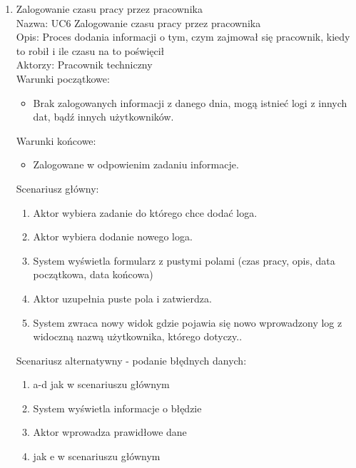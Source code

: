 \begin{enumerate}
\item Zalogowanie czasu pracy przez pracownika \\
Nazwa: UC6 Zalogowanie czasu pracy przez pracownika \\
Opis: Proces dodania informacji o tym, czym zajmował się pracownik, kiedy to robił i ile czasu na to poświęcił \\
Aktorzy: Pracownik techniczny \\
Warunki początkowe:
\begin{itemize}
\item Brak zalogowanych informacji z danego dnia, mogą istnieć logi z innych dat, bądź innych użytkowników.
\end{itemize}
Warunki końcowe:
\begin{itemize}
\item Zalogowane w odpowienim zadaniu informacje.
\end{itemize}
Scenariusz główny:
\begin{enumerate}
\item Aktor wybiera zadanie do którego chce dodać loga.
\item Aktor wybiera dodanie nowego loga.
\item System wyświetla formularz z pustymi polami (czas pracy, opis, data początkowa, data końcowa)
\item Aktor uzupełnia puste pola i zatwierdza.
\item System zwraca nowy widok gdzie pojawia się nowo wprowadzony log z widoczną nazwą użytkownika, którego dotyczy..
\end{enumerate}
Scenariusz alternatywny - podanie błędnych danych: 
\begin{enumerate}
\item a-d jak w scenariuszu głównym
\item System wyświetla informacje o błędzie
\item Aktor wprowadza prawidłowe dane
\item jak e w scenariuszu głównym
\end{enumerate}

\end{enumerate}